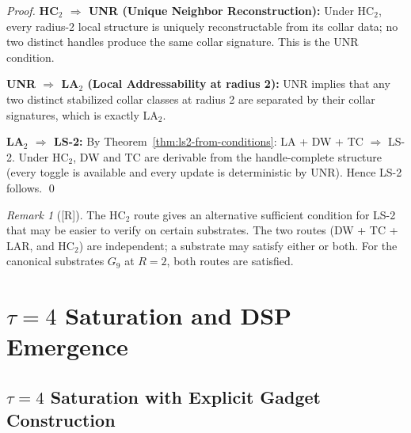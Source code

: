 \documentclass[12pt,oneside]{amsbook}
\theoremstyle{plain}
\theoremstyle{definition}
\theoremstyle{remark}
\newtheorem{remark}[theorem]{Remark}
\newcommand{\status}[1]{\textup{[#1]}}
\begin{document}
\begin{proof}
\textbf{HC$_2$ $\Rightarrow$ UNR (Unique Neighbor Reconstruction):}
Under $\mathrm{HC}_2$, every radius-2 local structure is uniquely
reconstructable from its collar data; no two distinct handles
produce the same collar signature.  This is the UNR condition.

\textbf{UNR $\Rightarrow$ LA$_2$ (Local Addressability at radius 2):}
UNR implies that any two distinct stabilized collar classes at
radius 2 are separated by their collar signatures, which is
exactly LA$_2$.

\textbf{LA$_2$ $\Rightarrow$ LS-2:}
By Theorem~\ref{thm:ls2-from-conditions}: LA + DW + TC $\Rightarrow$
LS-2.  Under $\mathrm{HC}_2$, DW and TC are derivable from the
handle-complete structure (every toggle is available and every
update is deterministic by UNR).  Hence LS-2 follows. \qed
\end{proof}

\begin{remark}[\status{R}]
The HC$_2$ route gives an alternative sufficient condition for
LS-2 that may be easier to verify on certain substrates.  The
two routes (DW + TC + LAR, and HC$_2$) are independent; a
substrate may satisfy either or both.  For the canonical
substrates $G_9$ at $R=2$, both routes are satisfied.
\end{remark}

\section{$\tau=4$ Saturation and DSP Emergence}
\label{sec:tau4-dsp}

\subsection{$\tau=4$ Saturation with Explicit Gadget Construction}
\end{document}
